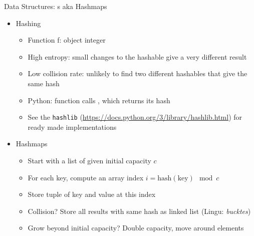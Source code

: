 \begin{frame}{Data Structures: s aka Hashmaps}
%
\begin{itemize}
\item Hashing
	\begin{itemize}
	\item Function f: object \thus integer
	\item High entropy: small changes to the hashable give a very different result
	\item Low collision rate: unlikely to find two different hashables that give the same hash
	\item Python: function  calls , which returns its hash
	\item See the \texttt{hashlib} (\url{https://docs.python.org/3/library/hashlib.html}) for ready made implementations
	\end{itemize}
\item Hashmaps
	\begin{itemize}
	\item Start with a list of given initial capacity $c$
	\item For each key, compute an array index $i = \text{hash}(\text{key}) \mod c$
	\item Store tuple of key and value at this index
	\item Collision? Store all results with same hash as linked list (Lingu: \emph{bucktes})
	\item Grow beyond initial capacity? Double capacity, move around elements
	\end{itemize}
\end{itemize}
%
\end{frame}


